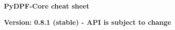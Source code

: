 \documentclass[9pt,landscape]{article}
\begin{document}
\raggedright
\footnotesize


\begin{center}
     \Huge{\textbf{PyDPF-Core cheat sheet}} \\
\end{center}
\begin{center}
\small{\textbf{Version: 0.8.1 (stable) - API is subject to change}} \
\end{center}
\vspace{-0.15cm}
\noindent\makebox[\linewidth]{\rule{\paperwidth}{2pt}}
\end{document}
